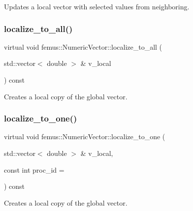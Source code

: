 Updates a local vector with selected values from neighboring. 

\mbox{\label{classfemus_1_1_numeric_vector_a912461feae9b5a74418e26da08d1fca3}} 
\subsubsection{\texorpdfstring{localize\+\_\+to\+\_\+all()}{localize\_to\_all()}}
{\footnotesize\ttfamily virtual void femus\+::\+Numeric\+Vector\+::localize\+\_\+to\+\_\+all (\begin{DoxyParamCaption}\item[{std\+::vector$<$ double $>$ \&}]{v\+\_\+local }\end{DoxyParamCaption}) const\hspace{0.3cm}{\ttfamily [pure virtual]}}



Creates a local copy of the global vector. 

\mbox{\label{classfemus_1_1_numeric_vector_a79162ba04fabd23806f9bd4ac360e59c}} 
\subsubsection{\texorpdfstring{localize\+\_\+to\+\_\+one()}{localize\_to\_one()}}
{\footnotesize\ttfamily virtual void femus\+::\+Numeric\+Vector\+::localize\+\_\+to\+\_\+one (\begin{DoxyParamCaption}\item[{std\+::vector$<$ double $>$ \&}]{v\+\_\+local,  }\item[{const int}]{proc\+\_\+id = {} }\end{DoxyParamCaption}) const\hspace{0.3cm}{\ttfamily [pure virtual]}}



Creates a local copy of the global vector. 

